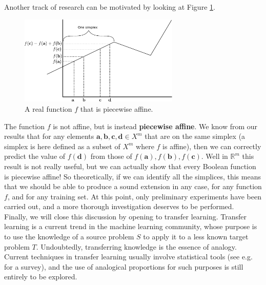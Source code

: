 Another track of research can be motivated by looking at Figure
\ref{FIG:piecewise_affine}.
\begin{figure}[!h]
\centering
  \includegraphics[width=3in]{figures/piecewise_affine.pdf}
  \caption{A real function $f$ that is piecewise affine.}
\label{FIG:piecewise_affine}
\end{figure}
The function $f$ is not affine, but is instead \textbf{piecewise affine}. We
know from our results that for any elements $\mathbf{a}, \mathbf{b},
\mathbf{c}, \mathbf{d} \in X^m$ that are on the same simplex (a simplex is here
defined as a subset of $X^m$ where $f$ is affine), then we can correctly
predict the value of $f(\mathbf{d})$ from those of $f(\mathbf{a}),
f(\mathbf{b}), f(\mathbf{c})$. Well in $\mathbb{R}^m$ this result is not really
useful, but we can actually show that every Boolean function is piecewise
affine! So theoretically, if we can identify all the simplices, this means that
we should be able to produce a sound extension in any case, for any function
$f$, and for any training set. At this point, only preliminary experiments
have been carried out, and a more thorough investigation deserves to be
performed.\\

Finally, we will close this discussion by opening to transfer learning.
Transfer learning is a current trend in the machine learning community, whose
purpose is to use the knowledge of a source problem $S$ to apply it to a less
known target problem $T$. Undoubtedly, transferring knowledge is the essence
of analogy. Current techniques in transfer learning usually involve statistical
tools (see e.g.  \cite{PanYanTKDE10} for a survey), and the use of analogical
proportions for such purposes is still entirely to be explored.
